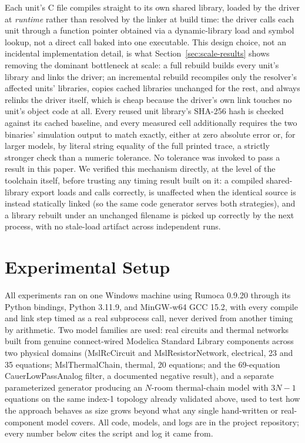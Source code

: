 \documentclass[journal]{IEEEtran}
\begin{document}
Each unit's C file compiles straight to its own shared library, loaded by the driver at \emph{runtime} rather than resolved by the linker at build time: the driver calls each unit through a function pointer obtained via a dynamic-library load and symbol lookup, not a direct call baked into one executable. This design choice, not an incidental implementation detail, is what Section~\ref{sec:scale-results} shows removing the dominant bottleneck at scale: a full rebuild builds every unit's library and links the driver; an incremental rebuild recompiles only the resolver's affected units' libraries, copies cached libraries unchanged for the rest, and always relinks the driver itself, which is cheap because the driver's own link touches no unit's object code at all. Every reused unit library's SHA-256 hash is checked against its cached baseline, and every measured cell additionally requires the two binaries' simulation output to match exactly, either at zero absolute error or, for larger models, by literal string equality of the full printed trace, a strictly stronger check than a numeric tolerance. No tolerance was invoked to pass a result in this paper. We verified this mechanism directly, at the level of the toolchain itself, before trusting any timing result built on it: a compiled shared-library export loads and calls correctly, is unaffected when the identical source is instead statically linked (so the same code generator serves both strategies), and a library rebuilt under an unchanged filename is picked up correctly by the next process, with no stale-load artifact across independent runs.

\section{Experimental Setup}
\label{sec:setup}

All experiments ran on one Windows machine using Rumoca 0.9.20 through its Python bindings, Python 3.11.9, and MinGW-w64 GCC 15.2, with every compile and link step timed as a real subprocess call, never derived from another timing by arithmetic. Two model families are used: real circuits and thermal networks built from genuine connect-wired Modelica Standard Library components across two physical domains (MslRcCircuit and MslResistorNetwork, electrical, 23 and 35 equations; MslThermalChain, thermal, 20 equations; and the 69-equation CauerLowPassAnalog filter, a documented negative result), and a separate parameterized generator producing an $N$-room thermal-chain model with $3N{-}1$ equations on the same index-1 topology already validated above, used to test how the approach behaves as size grows beyond what any single hand-written or real-component model covers. All code, models, and logs are in the project repository; every number below cites the script and log it came from.
\end{document}
